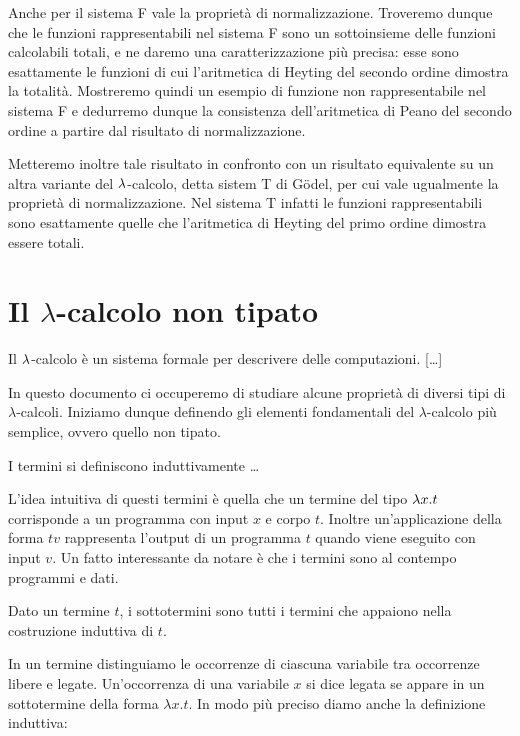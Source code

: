 \documentclass[]{marticle}
\begin{document}
Anche per il sistema F vale la propriet\`a di normalizzazione. Troveremo dunque
che le funzioni rappresentabili nel sistema F sono un sottoinsieme delle
funzioni calcolabili totali, e ne daremo una caratterizzazione pi\`u precisa:
esse sono esattamente le funzioni di cui l'aritmetica di Heyting del secondo
ordine dimostra la totalit\`a.  Mostreremo quindi un esempio di funzione non
rappresentabile nel sistema F e dedurremo dunque la consistenza dell'aritmetica
di Peano del secondo ordine a partire dal risultato di normalizzazione.

Metteremo inoltre tale risultato in confronto con un risultato equivalente su un
altra variante del $\lambda$-calcolo, detta sistem T di G\"odel, per cui vale
ugualmente la propriet\`a di normalizzazione. Nel sistema T infatti le funzioni
rappresentabili sono esattamente quelle che l'aritmetica di Heyting del primo
ordine dimostra essere totali.

\section{Il $\lambda$-calcolo non tipato}

Il $\lambda$-calcolo \`e un sistema formale per descrivere delle computazioni.
[\dots]

In questo documento ci occuperemo di studiare alcune propriet\`a di diversi tipi
di $\lambda$-calcoli. Iniziamo dunque definendo gli elementi fondamentali del
$\lambda$-calcolo pi\`u semplice, ovvero quello non tipato.

\begin{block}[Definizione]
    I termini si definiscono induttivamente \dots
\end{block}

L'idea intuitiva di questi termini \`e quella che un termine del tipo $\lambda x.t$
corrisponde a un programma con input $x$ e corpo $t$. Inoltre un'applicazione
della forma $tv$ rappresenta l'output di un programma $t$ quando viene eseguito
con input $v$. Un fatto interessante da notare \`e che i termini sono al
contempo programmi e dati.

\begin{block}[Definizione]
Dato un termine $t$, i sottotermini sono tutti i termini che appaiono nella
costruzione induttiva di $t$.
\end{block}

In un termine distinguiamo le occorrenze di ciascuna variabile tra occorrenze
libere e legate. Un'occorrenza di una variabile $x$ si dice legata se appare in
un sottotermine della forma $\lambda x. t$. In modo pi\`u preciso diamo anche la
definizione induttiva:
\end{document}
